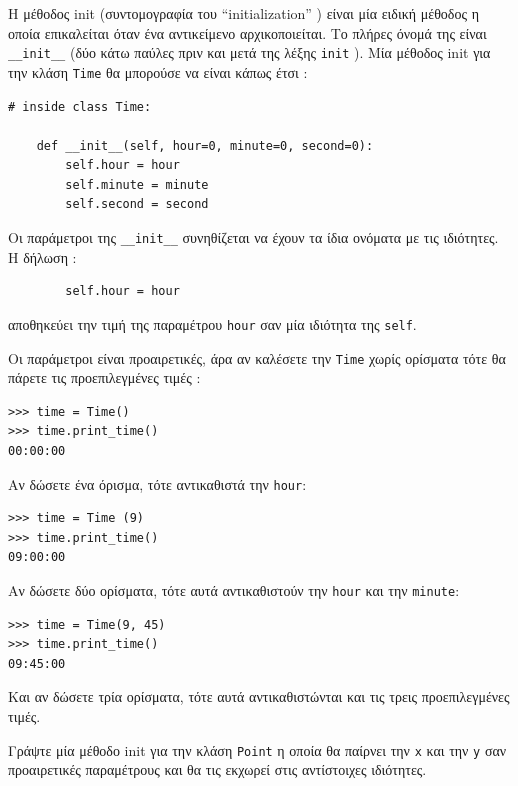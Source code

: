\documentclass[10pt]{book}
\begin{document}
Η μέθοδος  init  (συντομογραφία του ``initialization'' ) είναι μία ειδική μέθοδος η οποία επικαλείται όταν ένα αντικείμενο αρχικοποιείται.  Το πλήρες όνομά της είναι  \verb"__init__"  (δύο κάτω παύλες πριν και μετά της λέξης  {\tt init} ). Μία μέθοδος  init  για την κλάση  {\tt Time}  θα μπορούσε να είναι κάπως έτσι :

\begin{verbatim}
# inside class Time:

    def __init__(self, hour=0, minute=0, second=0):
        self.hour = hour
        self.minute = minute
        self.second = second
\end{verbatim}
%
 Οι παράμετροι της  \verb"__init__"  συνηθίζεται να έχουν τα ίδια ονόματα με τις ιδιότητες.  Η δήλωση :

\begin{verbatim}
        self.hour = hour
\end{verbatim}
%
 αποθηκεύει την τιμή της παραμέτρου  {\tt hour}  σαν μία ιδιότητα της  
{\tt self}.

 Οι παράμετροι είναι προαιρετικές, άρα αν καλέσετε την  {\tt Time}  χωρίς ορίσματα τότε θα πάρετε τις προεπιλεγμένες τιμές :

\begin{verbatim}
>>> time = Time()
>>> time.print_time()
00:00:00
\end{verbatim}
%
 Αν δώσετε ένα όρισμα, τότε αντικαθιστά την  {\tt hour}:

\begin{verbatim}
>>> time = Time (9)
>>> time.print_time()
09:00:00
\end{verbatim}
%
 Αν δώσετε δύο ορίσματα, τότε αυτά αντικαθιστούν την  {\tt hour}  και την 
{\tt minute}:

\begin{verbatim}
>>> time = Time(9, 45)
>>> time.print_time()
09:45:00
\end{verbatim}
%
 Και αν δώσετε τρία ορίσματα, τότε αυτά αντικαθιστώνται και τις τρεις προεπιλεγμένες τιμές.


\begin{exercise}

Γράψτε μία μέθοδο  init  για την κλάση  {\tt Point}  η οποία θα παίρνει την 
 {\tt x}  και την  {\tt y}  σαν προαιρετικές παραμέτρους και θα τις εκχωρεί 
στις αντίστοιχες ιδιότητες.
\end{exercise}
\end{document}
